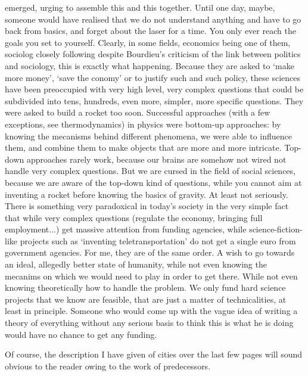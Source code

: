 emerged, urging to assemble this and this together. Until one day, maybe,
someone would have realised that we do not understand anything and have to go
back from basics, and forget about the laser for a time.
You only ever reach the goals you set to yourself.
Clearly, in some fields, economics being one of them, sociolog closely following
despite Bourdieu's criticism of the link between politics and sociology, this is
exactly what happening. Because they are asked to `make more money', `save the
conomy' or to justify such and such policy, these sciences have been preoccupied
with very high level, very complex questions that could be subdivided into tens,
hundreds, even more, simpler, more specific questions. They were asked to build
a rocket too soon. Successful approaches (with a few exceptions, see
thermodynamics) in physics were bottom-up approaches: by knowing the mecanisms
behind different phenomena, we were able to influence them, and combine them to
make objects that are more and more intricate. Top-down approaches rarely work,
because our brains are somehow not wired not handle very complex questions. But
we are cursed in the field of social sciences, because we are aware of the
top-down kind of questions, while you cannot aim at inventing a rocket before
knowing the basics of gravity. At least not seriously. There is something very
paradoxical in today's society in the very simple fact that while very complex
questions (regulate the economy, bringing full employment...) get massive
attention from funding agencies, while science-fiction-like projects such as
`inventing teletransportation' do not get a single euro from government
agencies. For me, they are of the same order. A wish to go towards an ideal,
allegedly better state of humanity, while not even knowing the mecanims on which
we would need to play in order to get there. While not even knowing
theoretically how to handle the problem. We only fund hard science projects that
we know are feasible, that are just a matter of technicalities, at least in
principle. Someone who would come up with the vague idea of writing a theory of
everything without any serious basis to think this is what he is doing would
have no chance to get any funding.

Of course, the description I have given of cities over the last few pages will
sound obvious to the reader owing to the work of predecessors.
